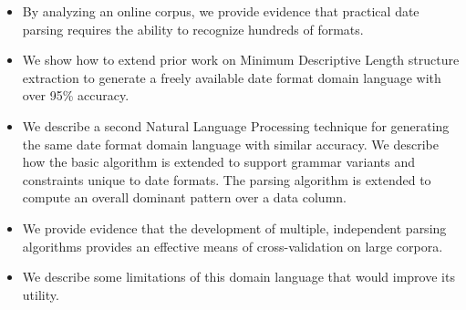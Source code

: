 \begin{itemize}
\setlength\itemsep{0em}
\item By analyzing an online corpus, we provide evidence that practical date parsing requires the ability to recognize hundreds of formats.
\item We show how to extend prior work on Minimum Descriptive Length structure extraction to generate a freely available date format domain language with over 95\% accuracy.
\item We describe a second Natural Language Processing technique for generating the same date format domain language with similar accuracy. We describe how the basic algorithm is extended to support grammar variants and constraints unique to date formats. The parsing algorithm is extended to compute an overall dominant pattern over a data column.
\item We provide evidence that the development of multiple, independent parsing algorithms provides an effective means of cross-validation on large corpora.
\item We describe some limitations of this domain language that would improve its utility.
\end{itemize}
